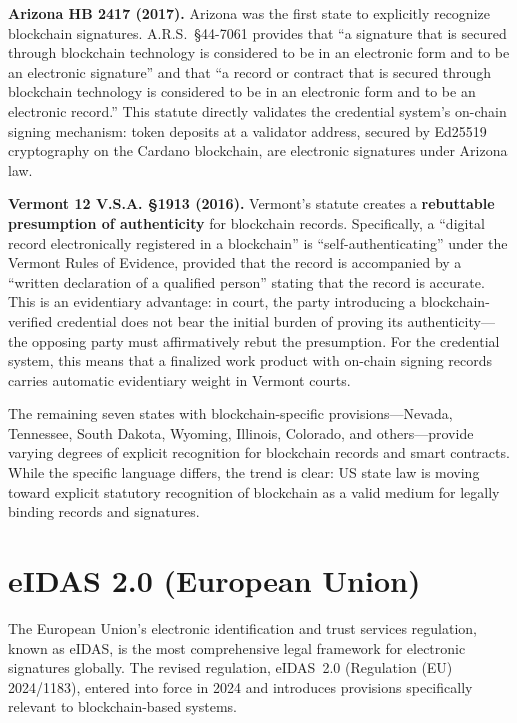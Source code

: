 \textbf{Arizona HB 2417 (2017).}  Arizona was the first state to explicitly
recognize blockchain signatures.  A.R.S.~\S44-7061 provides that
``a signature that is secured through blockchain technology is considered
to be in an electronic form and to be an electronic signature'' and that
``a record or contract that is secured through blockchain technology is
considered to be in an electronic form and to be an electronic record.''
This statute directly validates the credential system's on-chain signing
mechanism: token deposits at a validator address, secured by Ed25519
cryptography on the Cardano blockchain, are electronic signatures under
Arizona law.

\textbf{Vermont 12 V.S.A. \S1913 (2016).}  Vermont's statute creates a
\textbf{rebuttable presumption of authenticity} for blockchain records.
Specifically, a ``digital record electronically registered in a blockchain''
is ``self-authenticating'' under the Vermont Rules of Evidence, provided that
the record is accompanied by a ``written declaration of a qualified person''
stating that the record is accurate.  This is an evidentiary advantage:
in court, the party introducing a blockchain-verified credential does not
bear the initial burden of proving its authenticity---the opposing party must
affirmatively rebut the presumption.  For the credential system, this means
that a finalized work product with on-chain signing records carries
automatic evidentiary weight in Vermont courts.

The remaining seven states with blockchain-specific provisions---Nevada,
Tennessee, South Dakota, Wyoming, Illinois, Colorado, and others---provide
varying degrees of explicit recognition for blockchain records and smart
contracts.  While the specific language differs, the trend is clear:
US state law is moving toward explicit statutory recognition of blockchain
as a valid medium for legally binding records and signatures.


\section{eIDAS 2.0 (European Union)}
\label{sec:eidas}

The European Union's electronic identification and trust services regulation,
known as eIDAS, is the most comprehensive legal framework for electronic
signatures globally.  The revised regulation, eIDAS~2.0 (Regulation (EU)
2024/1183), entered into force in 2024 and introduces provisions
specifically relevant to blockchain-based systems.

